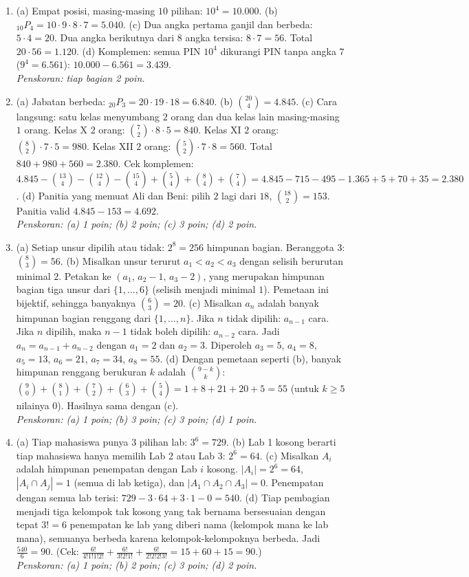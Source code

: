 \documentclass[a4paper,11pt]{article}
\newcommand{\Pm}[2]{{}_{#1}P_{#2}}
\newcounter{no}
\begin{document}
\small\begin{enumerate}[leftmargin=2em,itemsep=3pt,topsep=2pt]
\item[\textbf{1.}] (a) Empat posisi, masing-masing $10$ pilihan: $10^4=10.000$. (b) $\Pm{10}4=10\cdot9\cdot8\cdot7=5.040$. (c) Dua angka pertama ganjil dan berbeda: $5\cdot4=20$. Dua angka berikutnya dari $8$ angka tersisa: $8\cdot7=56$. Total $20\cdot56=1.120$. (d) Komplemen: semua PIN $10^4$ dikurangi PIN tanpa angka $7$ ($9^4=6.561$): $10.000-6.561=3.439$. \\ \textit{Penskoran: tiap bagian 2 poin.}
\item[\textbf{2.}] (a) Jabatan berbeda: $\Pm{20}3=20\cdot19\cdot18=6.840$. (b) $\binom{20}4=4.845$. (c) Cara langsung: satu kelas menyumbang $2$ orang dan dua kelas lain masing-masing $1$ orang. Kelas X $2$ orang: $\binom72\cdot8\cdot5=840$. Kelas XI $2$ orang: $\binom82\cdot7\cdot5=980$. Kelas XII $2$ orang: $\binom52\cdot7\cdot8=560$. Total $840+980+560=2.380$. Cek komplemen: $4.845-\binom{13}4-\binom{12}4-\binom{15}4+\binom54+\binom84+\binom74=4.845-715-495-1.365+5+70+35=2.380$. (d) Panitia yang memuat Ali dan Beni: pilih $2$ lagi dari $18$, $\binom{18}2=153$. Panitia valid $4.845-153=4.692$. \\ \textit{Penskoran: (a) 1 poin; (b) 2 poin; (c) 3 poin; (d) 2 poin.}
\item[\textbf{3.}] (a) Setiap unsur dipilih atau tidak: $2^8=256$ himpunan bagian. Beranggota $3$: $\binom83=56$. (b) Misalkan unsur terurut $a_1<a_2<a_3$ dengan selisih berurutan minimal $2$. Petakan ke $(a_1,\,a_2-1,\,a_3-2)$, yang merupakan himpunan bagian tiga unsur dari $\{1,\dots,6\}$ (selisih menjadi minimal $1$). Pemetaan ini bijektif, sehingga banyaknya $\binom63=20$. (c) Misalkan $a_n$ adalah banyak himpunan bagian renggang dari $\{1,\dots,n\}$. Jika $n$ tidak dipilih: $a_{n-1}$ cara. Jika $n$ dipilih, maka $n-1$ tidak boleh dipilih: $a_{n-2}$ cara. Jadi $a_n=a_{n-1}+a_{n-2}$ dengan $a_1=2$ dan $a_2=3$. Diperoleh $a_3=5$, $a_4=8$, $a_5=13$, $a_6=21$, $a_7=34$, $a_8=55$. (d) Dengan pemetaan seperti (b), banyak himpunan renggang berukuran $k$ adalah $\binom{9-k}k$: $\binom90+\binom81+\binom72+\binom63+\binom54=1+8+21+20+5=55$ (untuk $k\ge5$ nilainya $0$). Hasilnya sama dengan (c). \\ \textit{Penskoran: (a) 1 poin; (b) 3 poin; (c) 3 poin; (d) 1 poin.}
\item[\textbf{4.}] (a) Tiap mahasiswa punya $3$ pilihan lab: $3^6=729$. (b) Lab 1 kosong berarti tiap mahasiswa hanya memilih Lab 2 atau Lab 3: $2^6=64$. (c) Misalkan $A_i$ adalah himpunan penempatan dengan Lab $i$ kosong. $|A_i|=2^6=64$, $|A_i\cap A_j|=1$ (semua di lab ketiga), dan $|A_1\cap A_2\cap A_3|=0$. Penempatan dengan semua lab terisi: $729-3\cdot64+3\cdot1-0=540$. (d) Tiap pembagian menjadi tiga kelompok tak kosong yang tak bernama bersesuaian dengan tepat $3!=6$ penempatan ke lab yang diberi nama (kelompok mana ke lab mana), semuanya berbeda karena kelompok-kelompoknya berbeda. Jadi $\frac{540}{6}=90$. (Cek: $\frac{6!}{4!1!1!2!}+\frac{6!}{3!2!1!}+\frac{6!}{2!2!2!3!}=15+60+15=90$.) \\ \textit{Penskoran: (a) 1 poin; (b) 2 poin; (c) 3 poin; (d) 2 poin.}

\end{enumerate}
\end{document}
